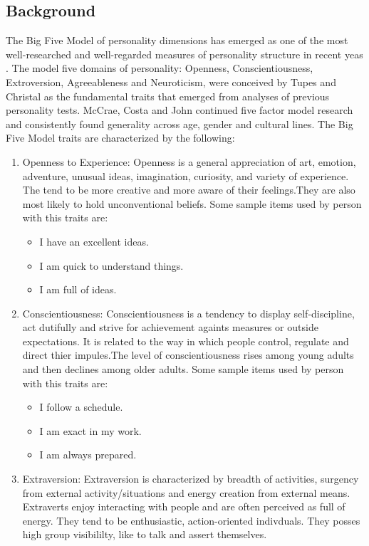 \subsection{Background}
The Big Five Model of personality dimensions has emerged as one of the most well-researched and well-regarded measures of personality structure in recent yeas \cite{fivefactormodel}. The model five domains of personality: Openness, Conscientiousness, Extroversion, Agreeableness and Neuroticism, were conceived by Tupes and Christal \cite{tupes} as the fundamental traits that emerged from analyses of previous personality tests. McCrae, Costa and John \cite{mccrae} continued five factor model research and consistently found generality across age, gender and cultural lines.
The Big Five Model traits are characterized by the following:
\begin{enumerate}
	\item Openness to Experience: Openness is a general appreciation of art, emotion, adventure, unusual ideas, imagination, curiosity, and variety of experience. The tend to be more creative and more aware of their feelings.They are also most likely to hold unconventional beliefs.
Some sample items used by person with this traits are:
\begin{itemize}
	\item I have an excellent ideas.
	\item I am quick to understand things.
	\item I am full of ideas.
\end{itemize}
\item Conscientiousness: Conscientiousness is a tendency to display self-discipline, act dutifully and strive for achievement againts measures or outside expectations. It is related to the way in which people control, regulate and direct thier impules.The level of conscientiousness rises among young adults and then declines among older adults.
Some sample items used by person with this traits are:
\begin{itemize}
	\item I follow a schedule.
	\item I am exact in my work.
	\item I am always prepared.
\end{itemize}
\item Extraversion: Extraversion is characterized by breadth of activities, surgency from external activity/situations and energy creation from external means. Extraverts enjoy interacting with people and are often perceived as full of energy. They tend to be enthusiastic, action-oriented indivduals. They posses high group visibililty, like to talk and assert themselves.

\end{enumerate}
